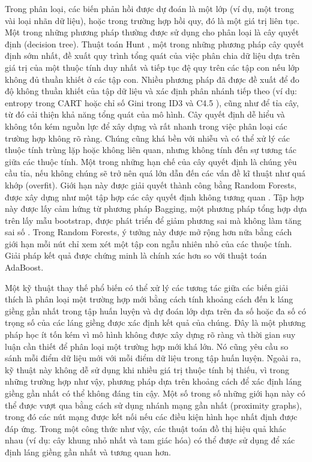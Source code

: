 \documentclass[utf8]{frontiersSCNS} %
\begin{document}
Trong phân loại, các biến phản hồi được dự đoán là một lớp (ví dụ, một trong vài loại nhãn dữ liệu), hoặc trong trường hợp hồi quy, đó là một giá trị liên tục. Một trong những phương pháp thường được sử dụng cho phân loại là cây quyết định (decision tree). Thuật toán Hunt \citep{Tan2016}, một trong những phương pháp cây quyết định sớm nhất, đề xuất quy trình tổng quát của việc phân chia dữ liệu dựa trên giá trị của một thuộc tính duy nhất và tiếp tục đệ quy trên các tập con nếu lớp không đủ thuần khiết ở các tập con. Nhiều phương pháp đã được đề xuất để đo độ không thuần khiết của tập dữ liệu và xác định phân nhánh tiếp theo (ví dụ: entropy trong CART \citep{Breiman2017} hoặc chỉ số Gini trong ID3 \citep{Quinlan1986} và C4.5 \citep{Quinlan2014}), cũng như để tỉa cây, từ đó cải thiện khả năng tổng quát của mô hình. Cây quyết định dễ hiểu và không tốn kém nguồn lực để xây dựng và rất nhanh trong việc phân loại các trường hợp không rõ ràng. Chúng cũng khá bền với nhiễu và có thể xử lý các thuộc tính trùng lặp hoặc không liên quan, nhưng không tính đến sự tương tác giữa các thuộc tính. Một trong những hạn chế của cây quyết định là chúng yêu cầu tỉa, nếu không chúng sẽ trở nên quá lớn dẫn đến các vấn đề kĩ thuật như quá khớp (overfit). Giới hạn này được giải quyết thành công bằng Random Forests, được xây dựng như một tập hợp các cây quyết định không tương quan \citep{Breiman2001}. Tập hợp này được lấy cảm hứng từ phương pháp Bagging, một phương pháp tổng hợp dựa trên lấy mẫu bootstrap, được phát triển để giảm phương sai mà không làm tăng sai số \citep{Breiman1996}. Trong Random Forests, ý tưởng này được mở rộng hơn nữa bằng cách giới hạn mỗi nút chỉ xem xét một tập con ngẫu nhiên nhỏ của các thuộc tính. Giải pháp kết quả được chứng minh là chính xác hơn so với thuật toán AdaBoost.

Một kỹ thuật thay thế phổ biến có thể xử lý các tương tác giữa các biến giải thích là phân loại một trường hợp mới bằng cách tính khoảng cách đến k láng giềng gần nhất trong tập huấn luyện và dự đoán lớp dựa trên đa số hoặc đa số có trọng số của các láng giềng được xác định kết quả của chúng. Đây là một phương pháp học ít tốn kém vì mô hình không được xây dựng rõ ràng và thời gian suy luận cần thiết để phân loại một trường hợp mới khá lớn. Nó cũng yêu cầu so sánh mỗi điểm dữ liệu mới với mỗi điểm dữ liệu trong tập huấn luyện. Ngoài ra, kỹ thuật này không dễ sử dụng khi nhiều giá trị thuộc tính bị thiếu, vì trong những trường hợp như vậy, phương pháp dựa trên khoảng cách để xác định láng giềng gần nhất có thể không đáng tin cậy. Một số trong số những giới hạn này có thể được vượt qua bằng cách sử dụng nhánh mạng gần nhất (proximity graphs), trong đó các nút mạng được kết nối nếu các điều kiện hình học nhất định được đáp ứng. Trong một công thức như vậy, các thuật toán đồ thị hiệu quả khác nhau (ví dụ: cây khung nhỏ nhất và tam giác hóa) có thể được sử dụng để xác định láng giềng gần nhất và tương quan hơn.
\end{document}
